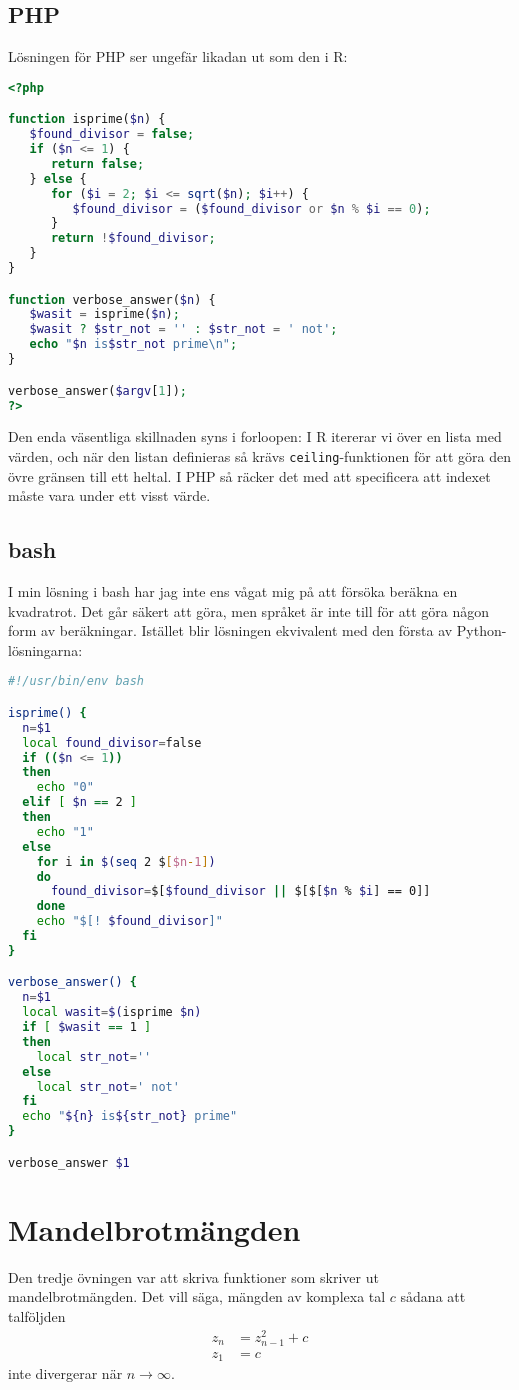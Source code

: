 \documentclass[10pt, twoside,a4paper]{article}
\begin{document}
\newpage
\subsection{PHP}
Lösningen för PHP ser ungefär likadan ut som den i R:
\begin{lstlisting}[language=PHP]
<?php

function isprime($n) {
   $found_divisor = false;
   if ($n <= 1) {
      return false;
   } else {
      for ($i = 2; $i <= sqrt($n); $i++) {
         $found_divisor = ($found_divisor or $n % $i == 0);
      }
      return !$found_divisor;
   }
}

function verbose_answer($n) {
   $wasit = isprime($n);
   $wasit ? $str_not = '' : $str_not = ' not';
   echo "$n is$str_not prime\n";
}

verbose_answer($argv[1]);
?>
\end{lstlisting}
Den enda väsentliga skillnaden syns i forloopen: I R itererar vi över en lista med värden, och när den listan definieras så krävs \verb+ceiling+-funktionen för att göra den övre gränsen till ett heltal. I PHP så räcker det med att specificera att indexet måste vara under ett visst värde.

\newpage
\subsection{bash}
I min lösning i bash har jag inte ens vågat mig på att försöka beräkna en kvadratrot. Det går säkert att göra, men språket är inte till för att göra någon form av beräkningar. Istället blir lösningen ekvivalent med den första av Python-lösningarna:
\begin{lstlisting}[language=bash]
#!/usr/bin/env bash

isprime() {
  n=$1
  local found_divisor=false
  if (($n <= 1))
  then
    echo "0"
  elif [ $n == 2 ]
  then
    echo "1"
  else
    for i in $(seq 2 $[$n-1])
    do
      found_divisor=$[$found_divisor || $[$[$n % $i] == 0]]
    done
    echo "$[! $found_divisor]"
  fi
}

verbose_answer() {
  n=$1
  local wasit=$(isprime $n)
  if [ $wasit == 1 ]
  then
    local str_not=''
  else
    local str_not=' not'
  fi
  echo "${n} is${str_not} prime"
}

verbose_answer $1
\end{lstlisting}



\newpage
\section{Mandelbrotmängden}
Den tredje övningen var att skriva funktioner som skriver ut mandelbrotmängden. Det vill säga, mängden av komplexa tal $c$ sådana att talföljden
\begin{align}
z_n &= z_{n-1}^2 + c \\
z_1 &= c
\end{align}
inte divergerar när $n \to \infty$.
\end{document}
